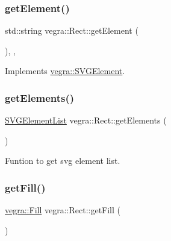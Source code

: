 \mbox{\label{structvegra_1_1Rect_a914ba572d7bda0dcb40b6f112d959f04}} 
\subsubsection{\texorpdfstring{get\+Element()}{getElement()}}
{\footnotesize\ttfamily std\+::string vegra\+::\+Rect\+::get\+Element (\begin{DoxyParamCaption}{ }\end{DoxyParamCaption})\hspace{0.3cm}{\ttfamily [inline]}, {\ttfamily [override]}, {\ttfamily [virtual]}}



Implements \mbox{\hyperlink{structvegra_1_1SVGElement_a17fa30b9de97e1541eaa1f6888145de2}{vegra\+::\+S\+V\+G\+Element}}.

\mbox{\label{structvegra_1_1Rect_a8d02abb21b9198be69cd888a20ff664a}} 
\subsubsection{\texorpdfstring{get\+Elements()}{getElements()}}
{\footnotesize\ttfamily \mbox{\hyperlink{namespacevegra_a2722f5eceb74f65746a02a57b71d125e}{S\+V\+G\+Element\+List}} vegra\+::\+Rect\+::get\+Elements (\begin{DoxyParamCaption}{ }\end{DoxyParamCaption})\hspace{0.3cm}{\ttfamily [inline]}}



Funtion to get svg element list. 

\mbox{\label{structvegra_1_1Rect_a3abeedcf01ddec54812aa4c0f21c1877}} 
\subsubsection{\texorpdfstring{get\+Fill()}{getFill()}}
{\footnotesize\ttfamily \mbox{\hyperlink{structvegra_1_1Fill}{vegra\+::\+Fill}} vegra\+::\+Rect\+::get\+Fill (\begin{DoxyParamCaption}{ }\end{DoxyParamCaption})\hspace{0.3cm}{\ttfamily [inline]}}

